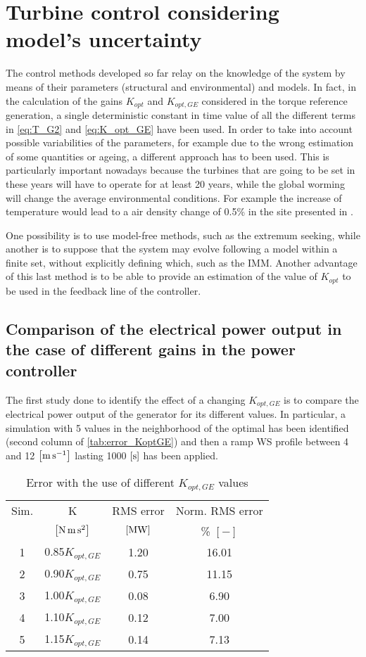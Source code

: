 \section{Turbine control considering model's uncertainty}\label{sec:c_other_controls}
The control methods developed so far relay on the knowledge of the system by means of their parameters (structural and environmental) and models. In fact, in the calculation of the gains $K_{opt}$ and $K_{opt,GE}$ considered in the torque reference generation, a single deterministic constant in time value of all the different terms in \autoref{eq:T_G2} and \autoref{eq:K_opt_GE} have been used. In order to take into account possible variabilities of the parameters, for example due to the wrong estimation of some quantities or ageing, a different approach has to been used. This is particularly important nowadays because the turbines that are going to be set in these years will have to operate for at least 20 years, while the global worming will change the average environmental conditions. For example the increase of temperature would lead to a air density change of 0.5\% in the site presented in \cite{en12112038}.

One possibility is to use model-free methods, such as the extremum seeking, while another is to suppose that the system may evolve following a model within a finite set, without explicitly defining which, such as the \acrfull{IMM}. Another advantage of this last method is to be able to provide an estimation of the value of $K_{opt}$ to be used in the feedback line of the controller. 

\subsection{Comparison of the electrical power output in the case of different gains in the power controller}\label{subsec:c_different_KoptGE}
The first study done to identify the effect of a changing $K_{opt,GE}$ is to compare the electrical power output of the generator for its  different values. In particular, a simulation with 5 values in the neighborhood of the optimal has been identified (second column of \autoref{tab:error_KoptGE}) and then a ramp WS profile between 4 and 12 $\left[\si{\meter\per\second}\right]$ lasting 1000 $\left[\si{\second}\right]$ has been applied.
\begin{table}[htb]
  \caption{Error with the use of different $K_{opt,GE}$ values}
  \centering
  \begin{tabular}{cc|cc}
  \toprule
  Sim. & K & RMS error & Norm. RMS error\\ 
   &  $\left[\si{\newton \meter \square \second}\right]$ & $\left[\si{\mega\watt}\right]$ & \% $\left[-\right]$ \\ \midrule
  1 & 0.85$K_{opt,GE}$  & 1.20 & 16.01\\
  2 & 0.90$K_{opt,GE}$  & 0.75 & 11.15\\
  3 & 1.00$K_{opt,GE}$  & 0.08 & 6.90\\
  4 & 1.10$K_{opt,GE}$  & 0.12 & 7.00\\
  5 & 1.15$K_{opt,GE}$  & 0.14 & 7.13\\ \bottomrule
  \end{tabular}
  \label{tab:error_KoptGE}
\end{table}

